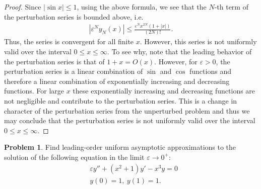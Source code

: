 \documentclass[12pt]{article}
\theoremstyle{definition}
\newtheorem{problem}{Problem}
\begin{document}
\begin{proof}
  Since $\left|\sin x\right| \leq 1$, using the above formula, we see that the   $N$-th term of the perturbation series is bounded above, i.e.\
  \begin{align*}
    \left|\varepsilon^N y_N(x)\right| \leq \frac{\varepsilon^N x^{2N} (1 + |x|)}{(2N)!}.
  \end{align*}
  Thus, the series is convergent for all finite $x$. However, this series is not uniformly valid over the interval
  $0 \leq x \leq \infty$. To see why, note that the leading behavior of the perturbation series
  is that of $1 + x = O(x)$. However, for $\varepsilon > 0$, the perturbation series
  is a linear combination of $\sin $ and $\cos$ functions and therefore a
  linear combination of exponentially increasing and decreasing functions.
  For large $x$ these exponentially increasing and decreasing functions are not negligible and contribute to
  the perturbation series. This is a change in character of the perturbation series from the unperturbed problem and thus we may
  conclude that the perturbation series is not uniformly valid over the interval $0 \leq x \leq \infty$.
\end{proof}
\newpage


\begin{problem}
  Find leading-order uniform asymptotic approximations to the solution of the
  following equation in the limit $\varepsilon \to 0^+$:
  \begin{align*}
    &\varepsilon y'' + (x^2 + 1)y' - x^3y=0 \\
    &y(0) = 1,\ y(1) = 1.
  \end{align*}
\end{problem}
\end{document}

